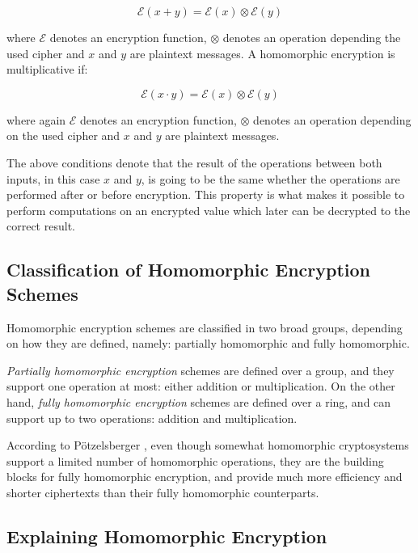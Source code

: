 
\[
\mathcal{E}(x+y) = \mathcal{E}(x)\otimes \mathcal{E}(y)
\]

where $\mathcal{E}$ denotes an encryption function, $\otimes$ denotes an operation depending the used cipher and $x$ and $y$ are plaintext messages. A homomorphic encryption is multiplicative if:

\[
\mathcal{E}(x \cdot y) = \mathcal{E}(x) \otimes \mathcal{E}(y)
\]

where again $\mathcal{E}$ denotes an encryption function, $\otimes$ denotes an operation depending on the used cipher and $x$ and $y$ are plaintext messages.

The above conditions denote that the result of the operations between both inputs, in this case $x$ and $y$, is going to be the same whether the operations are performed after or before encryption. This property is what makes it possible to perform computations on an encrypted value which later can be decrypted to the correct result.

\subsection{Classification of Homomorphic Encryption Schemes}

Homomorphic encryption schemes are classified in two broad groups, depending on how they are defined, namely: partially homomorphic and fully homomorphic. 

\textit{Partially homomorphic encryption} schemes are defined over a group, and they support one operation at most: either addition or multiplication. On the other hand, \textit{fully homomorphic encryption} schemes are defined over a ring, and can support up to two operations: addition and multiplication.

According to P{\"o}tzelsberger \cite{potzelsberger2013kv}, even though somewhat homomorphic cryptosystems support a limited number of homomorphic operations, they are the building blocks for fully homomorphic encryption, and provide much more efficiency and shorter ciphertexts than their fully homomorphic counterparts. 


\subsection{Explaining Homomorphic Encryption}

